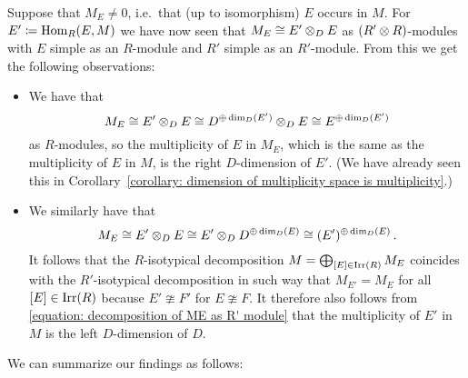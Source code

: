 

\begin{fluff}
  Suppose that $M_E \neq 0$, i.e.\ that (up to isomorphism) $E$ occurs in $M$.
  For $E' \coloneqq \operatorname{Hom}_R(E,M)$ we have now seen that $M_E \cong E' \mathbin{\otimes}_D E$ as $(R' \mathbin{\otimes} R)$-modules with $E$ simple as an $R$-module and $R'$ simple as an $R'$-module.
  From this we get the following observations:
  \begin{itemize}
    \item
      We have that
      \[
              M_E
        \cong E' \mathbin{\otimes}_D E
        \cong D^{\oplus \dim_D(E')} \mathbin{\otimes}_D E
        \cong E^{\oplus \dim_D(E')}
      \]
      as $R$-modules, so the multiplicity of $E$ in $M_E$, which is the same as the multiplicity of $E$ in $M$, is the right $D$-dimension of $E'$.
      (We have already seen this in Corollary~\ref{corollary: dimension of multiplicity space is multiplicity}.)
    \item
      We similarly have that
      \begin{equation}
        \label{equation: decomposition of ME as R' module}
              M_E
        \cong E' \mathbin{\otimes}_D E
        \cong E' \mathbin{\otimes}_D D^{\oplus \dim_D(E)}
        \cong (E')^{\oplus \dim_D(E)} \,.
      \end{equation}
      It follows that the $R$-isotypical decomposition $M = \bigoplus_{[E] \in \operatorname{Irr}(R)} M_E$ coincides with the $R'$-isotypical decomposition in such way that $M_{E'} = M_E$ for all $[E] \in \operatorname{Irr}(R)$ because $E' \ncong F'$ for $E \ncong F$.
      It therefore also follows from \eqref{equation: decomposition of ME as R' module} that the multiplicity of $E'$ in $M$ is the left $D$-dimension of $D$.
  \end{itemize}
  We can summarize our findings as follows:
\end{fluff}


